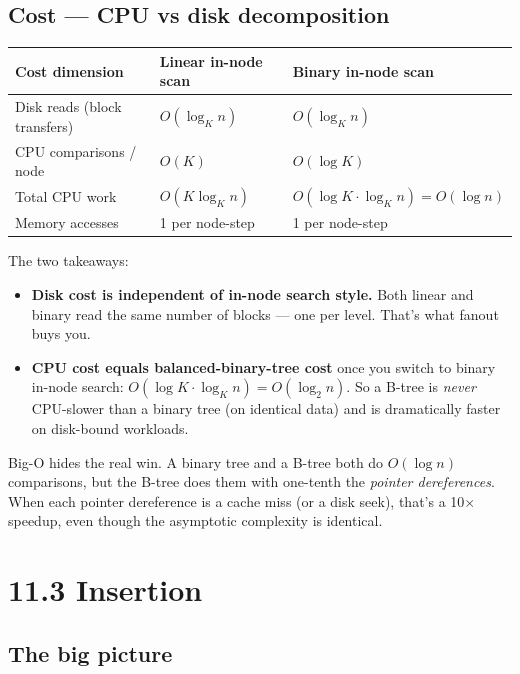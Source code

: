 \documentclass[11pt]{article}
\begin{document}
\subsection*{Cost --- CPU vs disk decomposition}

\begin{center}
\begin{tabular}{lll}
\hline
Cost dimension & Linear in-node scan & Binary in-node scan \\
\hline
Disk reads (block transfers) & $O(\log_K n)$ & $O(\log_K n)$ \\
CPU comparisons / node       & $O(K)$        & $O(\log K)$    \\
Total CPU work               & $O(K \log_K n)$ & $O(\log K \cdot \log_K n) = O(\log n)$ \\
Memory accesses              & 1 per node-step & 1 per node-step \\
\hline
\end{tabular}
\end{center}

The two takeaways:
\begin{itemize}[leftmargin=*]
    \item \textbf{Disk cost is independent of in-node search style.}
          Both linear and binary read the same number of blocks ---
          one per level. That's what fanout buys you.
    \item \textbf{CPU cost equals balanced-binary-tree cost} once
          you switch to binary in-node search:
          $O(\log K \cdot \log_K n) = O(\log_2 n)$. So a B-tree is
          \emph{never} CPU-slower than a binary tree (on identical
          data) and is dramatically faster on disk-bound workloads.
\end{itemize}

\begin{ideabox}
Big-O hides the real win. A binary tree and a B-tree both do $O(\log n)$ comparisons, but the B-tree does them with one-tenth the \emph{pointer dereferences}. When each pointer dereference is a cache miss (or a disk seek), that's a 10$\times$ speedup, even though the asymptotic complexity is identical.
\end{ideabox}

\section{11.3 Insertion}

\subsection*{The big picture}
\end{document}
